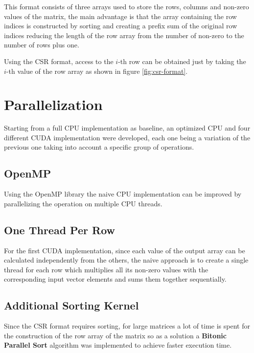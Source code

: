 \documentclass[conference]{IEEEtran}
\begin{document}
    This format consists of three arrays used to store the rows, columns and
    non-zero values of the matrix, the main advantage is that the array
    containing the row indices is constructed by sorting and creating a prefix
    sum of the original row indices reducing the length of the row array from
    the number of non-zero to the number of rows plus one.

    Using the CSR format, access to the $i$-th row can be obtained just by
    taking the $i$-th value of the row array as shown in figure
    \ref{fig:csr-format}.

    \section{Parallelization}

    Starting from a full CPU implementation as baseline, an optimized CPU and
    four different CUDA implementation were developed, each one being a
    variation of the previous one taking into account a specific group of
    operations.

    \subsection{OpenMP}

    Using the OpenMP library the naive CPU implementation can be improved by
    parallelizing the operation on multiple CPU threads.

    \subsection{One Thread Per Row}

    For the first CUDA implementation, since each value of the output array can
    be calculated independently from the others, the naive approach is to
    create a single thread for each row which multiplies all its non-zero
    values with the corresponding input vector elements and sums them together
    sequentially.

    \subsection{Additional Sorting Kernel}

    Since the CSR format requires sorting, for large matrices a lot of time is
    spent for the construction of the row array of the matrix so as a solution
    a \textbf{Bitonic Parallel Sort} algorithm was implemented to achieve
    faster execution time.
\end{document}
